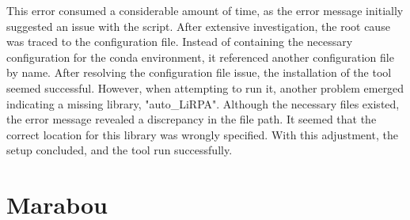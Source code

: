 \par This error consumed a considerable amount of time, as the error message initially suggested an issue with the script. After extensive investigation, the root cause was traced to the configuration file. Instead of containing the necessary configuration for the conda environment, it referenced another configuration file by name. After resolving the configuration file issue, the installation of the tool seemed successful. However, when attempting to run it, another problem emerged indicating a missing library, "auto\_LiRPA". Although the necessary files existed, the error message revealed a discrepancy in the file path. It seemed that the correct location for this library was wrongly specified. With this adjustment, the setup concluded, and the tool run successfully.
 

\section{Marabou}
\label{sec:ch2sec2}